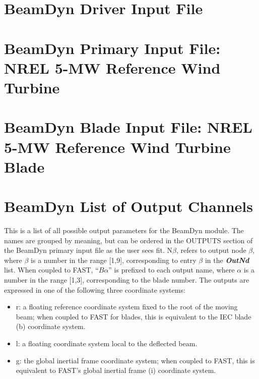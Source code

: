 \appendix
\chapter{BeamDyn Driver Input File}
\label{sec:AppDriver}



\chapter{BeamDyn Primary Input File: NREL 5-MW Reference Wind Turbine}
\label{sec:AppPrimary}


\chapter{BeamDyn Blade Input File: NREL 5-MW Reference Wind Turbine Blade}
\label{sec:AppBlade}


\chapter{BeamDyn List of Output Channels}
\label{sec:AppOutputChannel}
This is a list of all possible output parameters for the BeamDyn module.  The names are grouped by meaning, but can be ordered in the OUTPUTS section of the BeamDyn primary input file as the user sees fit.  N$\beta$, refers to output node $\beta$, where $\beta$ is a number in the range [1,9], corresponding to entry $\beta$ in the \textbf{\textit{OutNd}} list. When coupled to FAST, ``$B\alpha$'' is prefixed to each output name, where $\alpha$ is a number in the range [1,3], corresponding to the blade number.  The outputs are expressed in one of the following three coordinate systems:
\begin{itemize}
    \item r: a floating reference coordinate system fixed to the root of the moving beam; when coupled to FAST for blades, this is equivalent to the IEC blade (b) coordinate system.
    \item l: a floating coordinate system local to the deflected beam.
    \item g: the global inertial frame coordinate system; when coupled to FAST, this is equivalent to FAST's global inertial frame (i) coordinate system.
\end{itemize}
